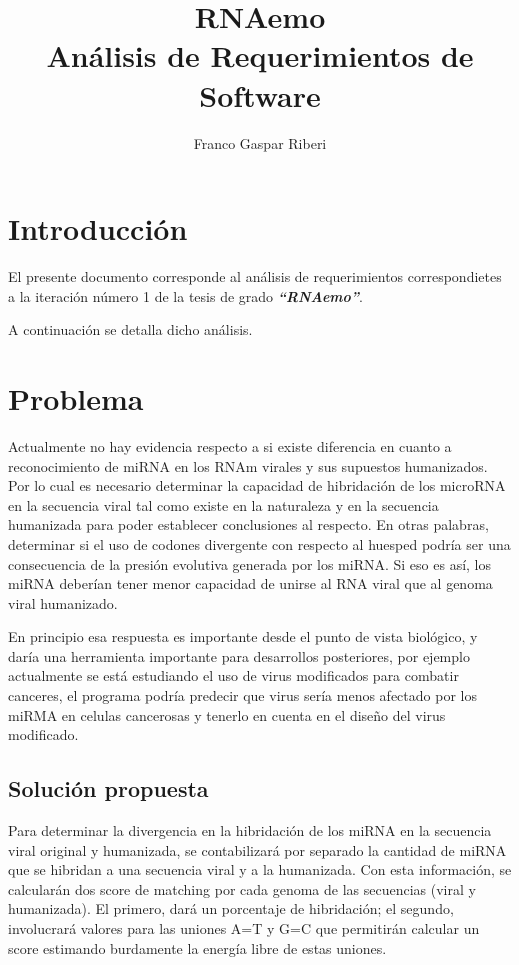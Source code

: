 \documentclass[12pt,a4paper,spanish]{article}
\title{\textbf{RNAemo}\\ \vspace{0.45cm} Análisis de Requerimientos de Software} %
\author{Franco Gaspar Riberi}
\begin{document}
\maketitle\pagebreak{}\tableofcontents{}\pagebreak{}

\newpage


\section{Introducción}
	\par El presente documento corresponde al análisis de requerimientos correspondietes a
	la iteración número 1 de la tesis de grado \textit{\textbf{``RNAemo''}}.
	\par A continuación se detalla dicho análisis.

\section{Problema}
	\par Actualmente no hay evidencia respecto a si existe diferencia en cuanto a reconocimiento de miRNA en los RNAm virales y sus supuestos humanizados. 		Por lo cual es necesario determinar la capacidad de hibridación de los microRNA en la secuencia viral tal como existe en la naturaleza y en la 	
	secuencia humanizada para poder establecer conclusiones al respecto. En otras palabras, determinar si el uso de codones divergente con respecto al 		huesped podría ser una consecuencia de la presión evolutiva generada por los miRNA. Si eso es así, los miRNA deberían tener menor capacidad de unirse 		al RNA viral que al genoma viral humanizado. 

	\par En principio esa respuesta es importante desde el punto de vista biológico, y daría una herramienta importante para desarrollos posteriores,
	por ejemplo actualmente se está estudiando el uso de virus modificados para combatir canceres, el programa podría predecir que virus sería menos 		afectado por los miRMA en celulas cancerosas y tenerlo en cuenta en el diseño del virus modificado.

	\subsection{Solución propuesta}
		\par Para determinar la divergencia en la hibridación de los miRNA en la secuencia viral original y humanizada, se contabilizará por separado la 			cantidad de miRNA que se hibridan a una secuencia viral y a la humanizada. Con esta información, se calcularán dos score de matching por cada 			genoma de las secuencias (viral y humanizada). El primero, dará un porcentaje de hibridación; el segundo, involucrará valores para las uniones 			\textsc{A=T} y \textsc{G=C} que permitirán calcular un score estimando burdamente la energía libre de estas uniones.
\end{document}
